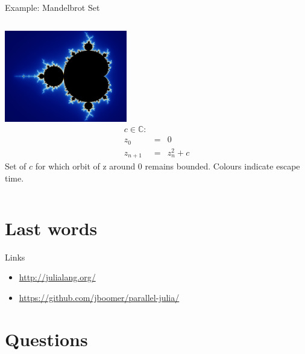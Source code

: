 \documentclass{beamer}
\begin{document}
	\begin{frame}{Example: Mandelbrot Set}
		\begin{columns}[c]
			\includegraphics[height = 4cm]{figures/mandel_zoom.jpg}	
			\begin{equation*}
			\begin{array}{rcl}
				c\in\mathbb{C}: & & \\
				z_0 & = & 0	\\
				z_{n+1} & = & z_n^2 + c
			\end{array}
			\end{equation*}
			Set of $c$ for which orbit of z around 0 remains bounded. Colours indicate escape time.
		\end{columns}
	\end{frame}
	
	\section{Last words}
	
	\begin{frame}{Links}
		\begin{itemize}
			\item{\url{http://julialang.org/}}
			\item{\url{https://github.com/jboomer/parallel-julia/}}
		\end{itemize}
	\end{frame}
	
	\section{Questions}
\end{document}
